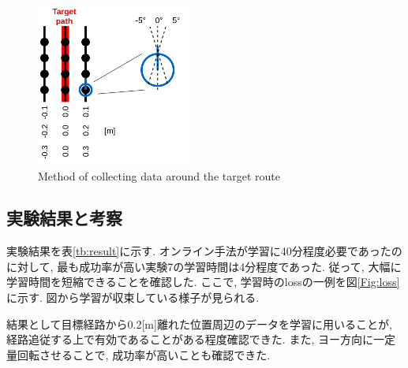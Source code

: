 \documentclass{ujarticle}
\begin{document}
\begin{figure}[h]
		\centering
		\includegraphics[width=0.45\textwidth]{img/collect2.png}
		\caption{Method of collecting data around the target route}
		\label{Fig:collect-data}
\end{figure}

\newpage
\subsection{実験結果と考察}
実験結果を表\ref{tb:result}に示す. オンライン手法が学習に40分程度必要であったのに対して, 最も成功率が高い実験7の学習時間は4分程度であった. 従って, 大幅に学習時間を短縮できることを確認した. ここで, 学習時のlossの一例を図\ref{Fig:loss}に示す. 図から学習が収束している様子が見られる. 
\par 結果として目標経路から0.2[m]離れた位置周辺のデータを学習に用いることが, 経路追従する上で有効であることがある程度確認できた. また, ヨー方向に一定量回転させることで, 成功率が高いことも確認できた. 


\end{document}
